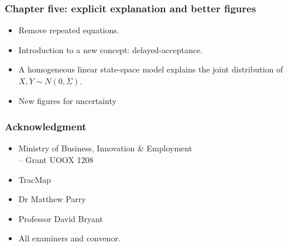 \documentclass{beamer}
\begin{document}
\begin{frame}
\frametitle{Chapter five: explicit explanation and better figures}

\begin{itemize}
	\item Remove repeated equations.
	\item Introduction to a new concept: delayed-acceptance.
	\item A homogeneous linear state-space model explains the joint distribution of $X,Y \sim N(0,\Sigma)$.
	\item New figures for uncertainty 
	\begin{figure}[h]
		\centering
	\end{figure}
\end{itemize}


\end{frame}

\begin{frame}
\frametitle{Acknowledgment}
\begin{itemize}
\item Ministry of Business, Innovation \& Employment\\
 \hskip 0.5cm -- Grant UOOX 1208\\
\item TracMap\\
\item Dr Matthew Parry\\
\item Professor David Bryant \\
\item All examiners and convenor. 
\end{itemize}
\end{frame}
\end{document}
